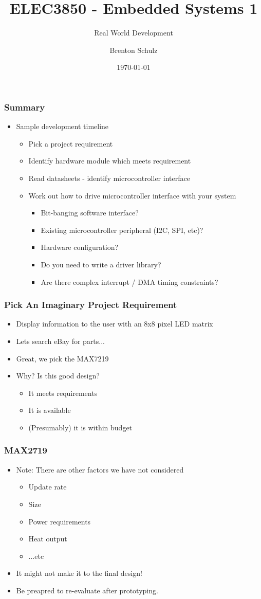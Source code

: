 \documentclass[14pt]{beamer}
\title{ELEC3850 - Embedded Systems 1}
\subtitle{Real World Development}
\author{Brenton Schulz}
\institute{University of Newcastle}
\date{\today}
\begin{document}
\titlepage

\begin{frame}
\frametitle{Summary}
\begin{itemize}
\item Sample development timeline
	\begin{itemize}
	\item Pick a project requirement
	\item Identify hardware module which meets requirement
	\item Read datasheets - identify microcontroller interface
	\item Work out how to drive microcontroller interface with your system
		\begin{itemize}
		\item Bit-banging software interface?
		\item Existing microcontroller peripheral (I2C, SPI, etc)?
		\item Hardware configuration?
		\item Do you need to write a driver library?
		\item Are there complex interrupt / DMA timing constraints?
		\end{itemize}
	\end{itemize}
\end{itemize}
\end{frame}

\begin{frame}[fragile]
\frametitle{Pick An Imaginary Project Requirement}
\begin{itemize}
\item Display information to the user with an 8x8 pixel LED matrix
\pause
\item Lets search eBay for parts...
\pause
\item Great, we pick the MAX7219
\item Why? Is this good design?
	\begin{itemize}
	\item It meets requirements
	\item It is available
	\item (Presumably) it is within budget
	\end{itemize}
\end{itemize}
\end{frame}

\begin{frame}[fragile]
\frametitle{MAX2719}
\begin{itemize}
\item Note: There are other factors we have not considered
\begin{itemize}
\item Update rate
\item Size
\item Power requirements
\item Heat output
\item ...etc
\end{itemize}
\item It might not make it to the final design!
\item Be preapred to re-evaluate after prototyping.
\end{itemize}
\end{frame}
\end{document}
